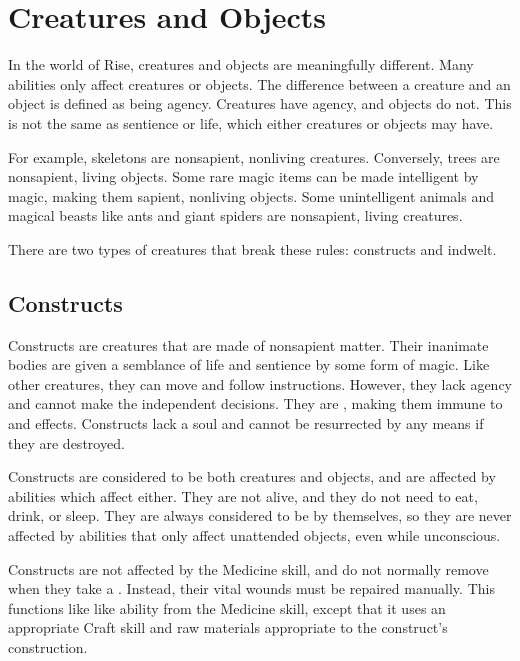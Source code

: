 \section{Creatures and Objects}
    In the world of Rise, creatures and objects are meaningfully different.
    Many abilities only affect creatures or objects.
    The difference between a creature and an object is defined as being agency.
    Creatures have agency, and objects do not.
    This is not the same as sentience or life, which either creatures or objects may have.

    For example, skeletons are nonsapient, nonliving creatures.
    Conversely, trees are nonsapient, living objects.
    Some rare magic items can be made intelligent by magic, making them sapient, nonliving objects.
    Some unintelligent animals and magical beasts like ants and giant spiders are nonsapient, living creatures.

    There are two types of creatures that break these rules: constructs and indwelt.

    \subsection{Constructs}\label{Constructs}
        Constructs are creatures that are made of nonsapient matter.
        Their inanimate bodies are given a semblance of life and sentience by some form of magic.
        Like other creatures, they can move and follow instructions.
        However, they lack agency and cannot make the independent decisions.
        They are , making them immune to  and  effects.
        Constructs lack a soul and cannot be resurrected by any means if they are destroyed.

        Constructs are considered to be both creatures and objects, and are affected by abilities which affect either.
        They are not alive, and they do not need to eat, drink, or sleep.
        They are always considered to be  by themselves, so they are never affected by abilities that only affect unattended objects, even while unconscious.

        Constructs are not affected by the Medicine skill, and do not normally remove  when they take a .
        Instead, their vital wounds must be repaired manually.
        This functions like like  ability from the Medicine skill, except that it uses an appropriate Craft skill and raw materials appropriate to the construct's construction.


